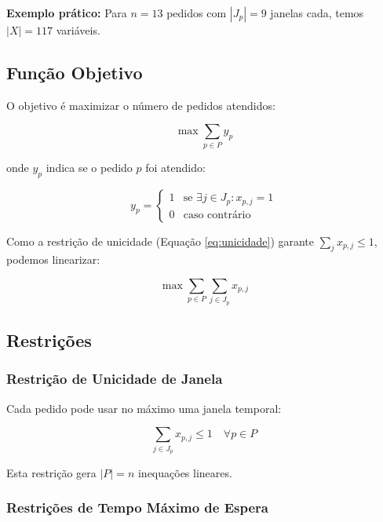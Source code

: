 \documentclass[12pt,a4paper]{article}
\theoremstyle{definition}
\begin{document}
\textbf{Exemplo prático:} Para $n=13$ pedidos com $|J_p|=9$ janelas cada, temos $|X|=117$ variáveis.

\subsection{Função Objetivo}

O objetivo é maximizar o número de pedidos atendidos:

\begin{equation}
\max \sum_{p \in P} y_p
\end{equation}

onde $y_p$ indica se o pedido $p$ foi atendido:

\begin{equation}
y_p = \begin{cases}
1 & \text{se } \exists j \in J_p : x_{p,j} = 1 \\
0 & \text{caso contrário}
\end{cases}
\end{equation}

Como a restrição de unicidade (Equação \ref{eq:unicidade}) garante $\sum_j x_{p,j} \leq 1$, podemos linearizar:

\begin{equation}
\max \sum_{p \in P} \sum_{j \in J_p} x_{p,j}
\label{eq:objetivo}
\end{equation}

\subsection{Restrições}

\subsubsection{Restrição de Unicidade de Janela}

Cada pedido pode usar no máximo uma janela temporal:

\begin{equation}
\sum_{j \in J_p} x_{p,j} \leq 1 \quad \forall p \in P
\label{eq:unicidade}
\end{equation}

Esta restrição gera $|P| = n$ inequações lineares.

\subsubsection{Restrições de Tempo Máximo de Espera}
\end{document}
